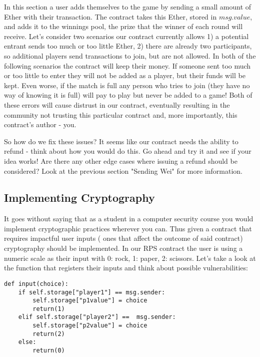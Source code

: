 \documentclass[12pt]{article}
\begin{document}
In this section a user adds themselves to the game by sending a small amount of Ether with their transaction. The contract takes this Ether, stored in $msg.value$, and adds it to the winnings pool, the prize that the winner of each round will receive. Let's consider two scenarios our contract currently allows 1) a potential entrant sends too much or too little Ether, 2) there are already two participants, so additional players send transactions to join, but are not allowed. In both of the following scenarios the contract will keep their money. If someone sent too much or too little to enter they will not be added as a player, but their funds will be kept. Even worse, if the match is full any person who tries to join (they have no way of knowing it is full) will pay to play but never be added to a game! Both of these errors will cause distrust in our contract, eventually resulting in the community not trusting this particular contract and, more importantly, this contract's author - you.

So how do we fix these issues? It seems like our contract needs the ability to refund - think about how you would do this. Go ahead and try it and see if your idea works! Are there any other edge cases where issuing a refund should be considered? Look at the previous section "Sending Wei" for more information. 

\subsection{Implementing Cryptography}
It goes without saying that as a student in a computer security course you would implement cryptographic practices wherever you can. Thus given a contract that requires impactful user inputs ( ones that affect the outcome of said contract) cryptography should be implemented. In our RPS contract the user is using a numeric scale as their input with 0: rock, 1: paper, 2: scissors. Let's take a look at the function that registers their inputs and think about possible vulnerabilities:

\begin{lstlisting}[frame=single]
def input(choice):
	if self.storage["player1"] == msg.sender:
		self.storage["p1value"] = choice
		return(1)
	elif self.storage["player2"] ==  msg.sender:
		self.storage["p2value"] = choice
		return(2)
	else:
		return(0)
\end{lstlisting}
\end{document}
